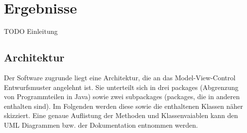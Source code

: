 \documentclass[12pt,a4paper,bibliography=totocnumbered,listof=totocnumbered]{scrartcl}
\begin{document}
\pagebreak


\section{Ergebnisse}\label{ErgebnisseV}
TODO Einleitung
\subsection{Architektur}
Der Software zugrunde liegt eine Architektur, die an das Model-View-Control Entwurfsmuster angelehnt ist. Sie unterteilt sich in drei packages (Abgrenzung von Programmteilen in Java) sowie zwei subpackages (packages, die in anderen enthalten sind). Im Folgenden werden diese sowie die enthaltenen Klassen näher skizziert. Eine genaue Auflistung der Methoden und Klassenvaiablen kann den UML Diagrammen bzw. der Dokumentation entnommen werden.
\end{document}
